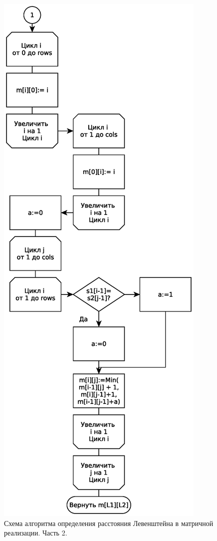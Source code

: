 \begin{figure}
    \centering
    \includegraphics[height=0.75\textheight]{schemes/levenshtein-iterative-eps-2}
    \caption{Схема алгоритма определения расстояния Левенштейна в матричной реализации. Часть 2.}
    \label{levenshtein-iterative-scheme-part-2}
\end{figure}

